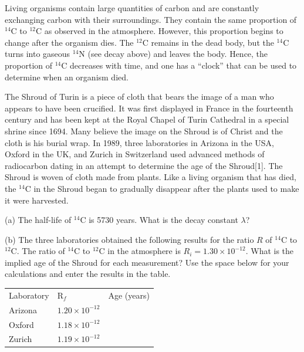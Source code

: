 Living organisms contain large quantities of carbon and are constantly
exchanging carbon with their surroundings. They contain the same proportion
of \( ^{14} \)C to \( ^{12} \)C as observed in the atmosphere. However,
this proportion begins to change after the organism dies. The \( ^{12} \)C
remains in the dead body, but the \( ^{14} \)C turns into gaseous
\( ^{14} \)N (see decay above) and leaves the body. Hence, the proportion
of \( ^{14} \)C decreases with time, and one has a {}``clock''
that can be used to determine when an organism died. 

The Shroud of Turin is a piece of cloth that bears the image of a
man who appears to have been crucified. It was first displayed in
France in the fourteenth century and has been kept at the Royal Chapel
of Turin Cathedral in a special shrine since 1694. Many believe the
image on the Shroud is of Christ and the cloth is his burial wrap.
In 1989, three laboratories in Arizona in the USA, Oxford in the UK,
and Zurich in Switzerland used advanced methods of radiocarbon dating
in an attempt to determine the age of the Shroud{[}1{]}. The Shroud
is woven of cloth made from plants. Like a living organism that has
died, the \( ^{14} \)C in the Shroud began to gradually disappear
after the plants used to make it were harvested.

(a) The half-life of \( ^{14} \)C is 5730 years. What is the decay
constant \( \lambda  \)?
\vspace{25mm}

\newpage

(b) The three laboratories obtained the following results for the
ratio $R$ of \( ^{14} \)C to \( ^{12} \)C. The ratio of \( ^{14} \)C
to \( ^{12} \)C in the atmosphere is $R_{i} = 1.30 \times 10^{-12}$.
What is the implied age of the Shroud for each measurement? Use the
space below for your calculations and enter the results in the table. 
\vspace{0.3cm}

{\renewcommand{\arraystretch}{1.2}
{\centering \begin{tabular}{|C{1.0in}|C{1.0in}|C{1.0in}|}
\hline 
Laboratory &
R$_{f}$ &
Age (years) \\
\hhline{|=|=|=|}
Arizona&
$1.20 \times 10^{-12}$ &
\\
\hline 
Oxford&
$1.18 \times 10^{-12}$ &
\\
\hline 
Zurich&
$1.19 \times 10^{-12}$&
\\
\hline
\end{tabular}\par}}
\vspace{0.3cm}

